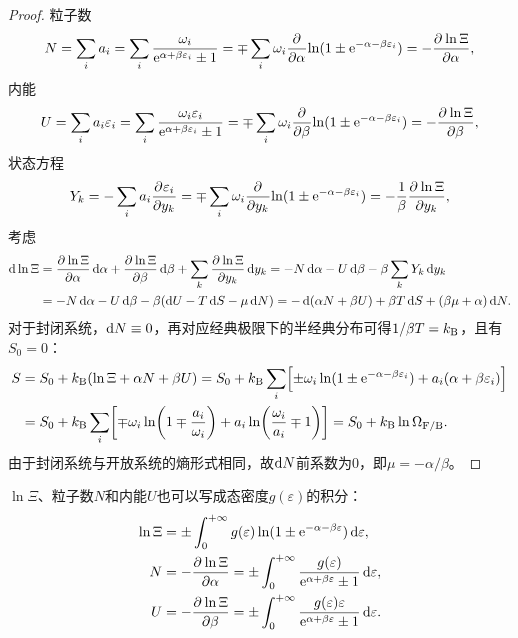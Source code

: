 \begin{proof}
	粒子数
	\[
		N=\sum_i a_i=\sum_i\frac{\omega_i}{\e{\alpha+\beta\varepsilon_i}\pm 1}=\mp\sum_i\omega_i\pp\alpha{\ln(1\pm\e{-\alpha-\beta\varepsilon_i})}=-\pv{\ln\Xi}\alpha,
	\]
	内能
	\[
		U=\sum_i a_i\varepsilon_i=\sum_i\frac{\omega_i\varepsilon_i}{\e{\alpha+\beta\varepsilon_i}\pm 1}=\mp\sum_i\omega_i\pp\beta{\ln(1\pm\e{-\alpha-\beta\varepsilon_i})}=-\pv{\ln\Xi}\beta,
	\]
	状态方程
	\[
		Y_k=-\sum_i a_i\pv{\varepsilon_i}{y_k}=\mp\sum_i\omega_i\pp{y_k}{\ln(1\pm\e{-\alpha-\beta\varepsilon_i})}=-\frac1\beta\pv{\ln\Xi}{y_k},
	\]
	考虑
	\begin{align*}
		\d\ln\Xi&=\pv{\ln\Xi}\alpha\d\alpha+\pv{\ln\Xi}\beta\d\beta+\sum_k\pv{\ln\Xi}{y_k}\d y_k=-N\d\alpha-U\d\beta-\beta\sum_k Y_k\d y_k\\
		&=-N\d\alpha-U\d\beta-\beta(\d U-T\d S-\mu\d N)=-\d(\alpha N+\beta U)+\beta T\d S+(\beta\mu+\alpha)\d N.
	\end{align*}
	对于封闭系统，$\d N\equiv 0$，再对应经典极限下的半经典分布可得$1/\beta T=\kB$，且有$S_0=0$：
	\begin{align*}
		S&=S_0+\kB(\ln\Xi+\alpha N+\beta U)=S_0+\kB\sum_i\Bigfkh{\pm\omega_i\ln(1\pm\e{-\alpha-\beta\varepsilon_i})+a_i(\alpha +\beta\varepsilon_i)}\\
		&=S_0+\kB\sum_i\biggfkh{\mp\omega_i\ln\biggkh{1\mp\frac{a_i}{\omega_i}}+a_i\ln\biggkh{\frac{\omega_i}{a_i}\mp 1}}=S_0+\kB\ln\Om[F/B].
	\end{align*}
	由于封闭系统与开放系统的熵形式相同，故$\d N$前系数为0，即$\mu=-\alpha/\beta$。
\end{proof}

\begin{corollary}
	$\ln\Xi$、粒子数$N$和内能$U$也可以写成态密度$g(\varepsilon)$的积分：
	\begin{subequations}
		\begin{align}
			\ln\Xi&=\pm\int\zti g(\varepsilon)\ln(1\pm\e{-\alpha-\beta\varepsilon})\d\varepsilon,\\
			N&=-\pv{\ln\Xi}\alpha=\pm\int\zti\frac{g(\varepsilon)}{\e{\alpha+\beta\varepsilon}\pm 1}\d\varepsilon,\\
			U&=-\pv{\ln\Xi}\beta=\pm\int\zti\frac{g(\varepsilon)\varepsilon}{\e{\alpha+\beta\varepsilon}\pm 1}\d\varepsilon.
		\end{align}
	\end{subequations}
\end{corollary}

